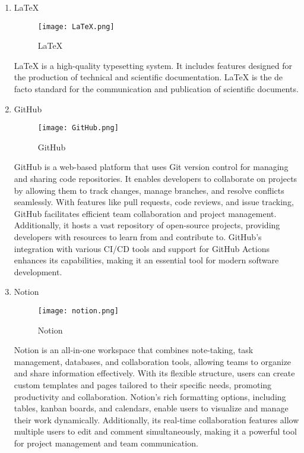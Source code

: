 \documentclass[conference]{IEEEtran}
\begin{document}
\begin{enumerate}[itemsep=2ex, parsep=1ex]
	\item LaTeX
	      	      
	      \begin{figure}[h!]
	      	\centering
	      	\texttt{[image: LaTeX.png]}
	      	\caption{LaTeX}
	      	\label{fig:LaTeX}
	      \end{figure}
	      	      
	      LaTeX is a high-quality typesetting system. It includes features designed for
	      the production of technical and scientific documentation. LaTeX is the de
	      facto standard for the communication and publication of scientific
	      documents.
	      
	      \vspace{5cm}
	      	      
	\item GitHub
	      	      
	      \begin{figure}[h!]
	      	\centering
	      	\texttt{[image: GitHub.png]}
	      	\caption{GitHub}
	      	\label{fig:GitHub}
	      \end{figure}
	      	      
	      GitHub is a web-based platform that uses Git version control for managing
	      and sharing code repositories. It enables developers to collaborate on projects
	      by allowing them to track changes, manage branches, and resolve conflicts seamlessly.
	      With features like pull requests, code reviews, and issue tracking, GitHub
	      facilitates efficient team collaboration and project management.
	      Additionally, it hosts a vast repository of open-source projects,
	      providing developers with resources to learn from and contribute to. GitHub's
	      integration with various CI/CD tools and support for GitHub Actions enhances
	      its capabilities, making it an essential tool for modern software
	      development.
	      	      
	\item Notion
	      	      
	      \begin{figure}[h!]
	      	\centering
	      	\texttt{[image: notion.png]}
	      	\caption{Notion}
	      	\label{fig:Notion}
	      \end{figure}
	      	      
	      Notion is an all-in-one workspace that combines note-taking, task management,
	      databases, and collaboration tools, allowing teams to organize and share
	      information effectively. With its flexible structure, users can create
	      custom templates and pages tailored to their specific needs, promoting productivity
	      and collaboration. Notion's rich formatting options, including tables,
	      kanban boards, and calendars, enable users to visualize and manage their
	      work dynamically. Additionally, its real-time collaboration features allow
	      multiple users to edit and comment simultaneously, making it a powerful tool
	      for project management and team communication.
	      

\end{enumerate}
\end{document}
